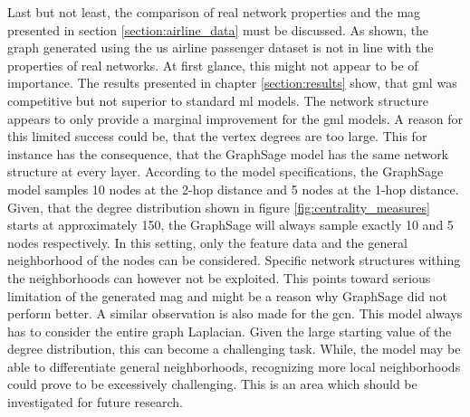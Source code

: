   \noindent Last but not least, the comparison of real network properties and
  the \acs{mag} presented in section \ref{section:airline_data} must be
  discussed. As shown, the graph generated using the \acs{us} airline passenger
  dataset is not in line with the properties of real networks. At first glance,
  this might not appear to be of importance. The results presented in chapter
  \ref{section:results} show, that \acs{gml} was competitive but not superior
  to standard \acs{ml} models. The network structure appears to only provide a
  marginal improvement for the \acs{gml} models. A reason for this limited
  success could be, that the vertex degrees are too large. This for instance has
  the consequence, that the GraphSage model has the same network structure at
  every layer. According to the model specifications, the GraphSage model
  samples 10 nodes at the 2-hop distance and 5 nodes at the 1-hop distance.
  Given, that the degree distribution shown in figure
  \ref{fig:centrality_measures} starts at approximately 150, the GraphSage will
  always sample exactly 10 and 5 nodes respectively. In this setting, only the 
  feature data and the general neighborhood of the nodes can be considered.
  Specific network structures withing the neighborhoods can however not be
  exploited. This points toward serious limitation of the generated \acs{mag} 
  and might be a reason why GraphSage did not perform better. A similar
  observation is also made for the \acs{gcn}. This model always has to consider
  the entire graph Laplacian. Given the large starting value of the degree
  distribution, this can become a challenging task. While, the model may be
  able to differentiate general neighborhoods, recognizing more local
  neighborhoods could prove to be excessively challenging. This is an area which
  should be investigated for future research.






